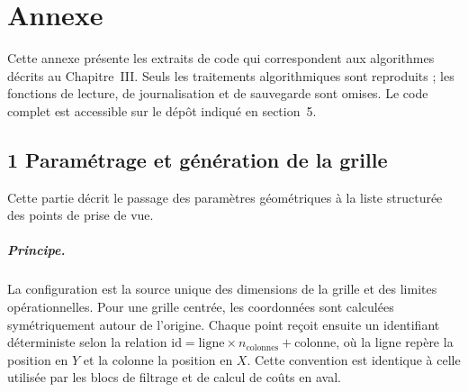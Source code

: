 \clearpage

\chapter*{Annexe}
\thispagestyle{plain}
\markboth{}{}

\renewcommand{\lstlistingname}{Listing}
\setcounter{lstlisting}{0}
\renewcommand{\thelstlisting}{\arabic{lstlisting}}
\captionsetup[lstlisting]{labelsep=space}


\vspace{-0.5em}
Cette annexe présente les extraits de code qui correspondent aux algorithmes décrits au Chapitre~III. Seuls les traitements algorithmiques sont reproduits ; les fonctions de lecture, de journalisation et de sauvegarde sont omises. Le code complet est accessible sur le dépôt indiqué en section~5.

\section*{1 Paramétrage et génération de la grille}
\vspace{-0.3em}
Cette partie décrit le passage des paramètres géométriques à la liste structurée des points de prise de vue.

\paragraph{Principe.}
La configuration est la source unique des dimensions de la grille et des limites opérationnelles. Pour une grille centrée, les coordonnées sont calculées symétriquement autour de l'origine. Chaque point reçoit ensuite un identifiant déterministe selon la relation $\mathrm{id} = \mathrm{ligne} \times n_{\mathrm{colonnes}} + \mathrm{colonne}$, où la ligne repère la position en $Y$ et la colonne la position en $X$. Cette convention est identique à celle utilisée par les blocs de filtrage et de calcul de coûts en aval.


